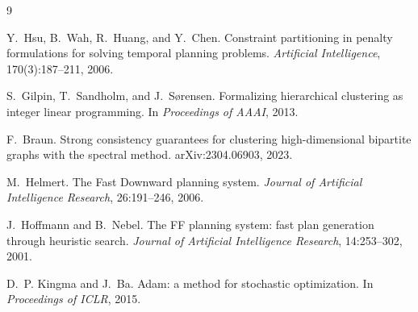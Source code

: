 \documentclass[11pt,a4paper]{article}
\begin{document}
\begin{thebibliography}{9}

Y.~Hsu, B.~Wah, R.~Huang, and Y.~Chen.
\newblock Constraint partitioning in penalty formulations for solving temporal
planning problems.
\newblock \emph{Artificial Intelligence}, 170(3):187--211, 2006.

S.~Gilpin, T.~Sandholm, and J.~S{\o}rensen.
\newblock Formalizing hierarchical clustering as integer linear programming.
\newblock In \emph{Proceedings of AAAI}, 2013.

F.~Braun.
\newblock Strong consistency guarantees for clustering high-dimensional
bipartite graphs with the spectral method.
\newblock arXiv:2304.06903, 2023.

M.~Helmert.
\newblock The Fast Downward planning system.
\newblock \emph{Journal of Artificial Intelligence Research}, 26:191--246, 2006.

J.~Hoffmann and B.~Nebel.
\newblock The FF planning system: fast plan generation through heuristic
search.
\newblock \emph{Journal of Artificial Intelligence Research}, 14:253--302, 2001.

D.~P. Kingma and J.~Ba.
\newblock Adam: a method for stochastic optimization.
\newblock In \emph{Proceedings of ICLR}, 2015.

\end{thebibliography}
\end{document}
